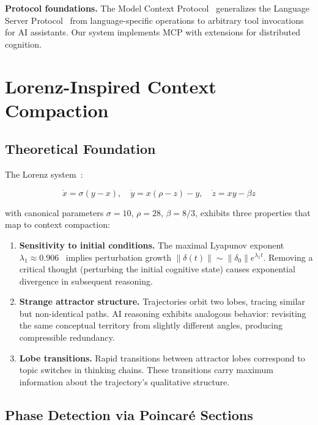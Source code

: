\documentclass[journal,10pt]{IEEEtran}
\begin{document}
\textbf{Protocol foundations.} The Model Context Protocol~\cite{mcp2024} generalizes the Language Server Protocol~\cite{lsp2016} from language-specific operations to arbitrary tool invocations for AI assistants. Our system implements MCP with extensions for distributed cognition.

\section{Lorenz-Inspired Context Compaction}
\label{sec:lorenz}

\subsection{Theoretical Foundation}

The Lorenz system~\cite{lorenz1963}:

\begin{equation}
\dot{x} = \sigma(y - x), \quad \dot{y} = x(\rho - z) - y, \quad \dot{z} = xy - \beta z
\label{eq:lorenz}
\end{equation}

\noindent with canonical parameters $\sigma = 10$, $\rho = 28$, $\beta = 8/3$, exhibits three properties that map to context compaction:

\begin{enumerate}[nosep]
\item \textbf{Sensitivity to initial conditions.} The maximal Lyapunov exponent $\lambda_1 \approx 0.906$~\cite{sparrow1982lorenz} implies perturbation growth $\|\delta(t)\| \sim \|\delta_0\| e^{\lambda_1 t}$. Removing a critical thought (perturbing the initial cognitive state) causes exponential divergence in subsequent reasoning.

\item \textbf{Strange attractor structure.} Trajectories orbit two lobes, tracing similar but non-identical paths. AI reasoning exhibits analogous behavior: revisiting the same conceptual territory from slightly different angles, producing compressible redundancy.

\item \textbf{Lobe transitions.} Rapid transitions between attractor lobes correspond to topic switches in thinking chains. These transitions carry maximum information about the trajectory's qualitative structure.
\end{enumerate}

\subsection{Phase Detection via Poincar\'{e} Sections}
\label{sec:phase}
\end{document}
